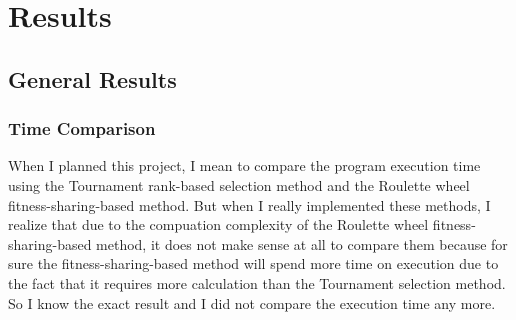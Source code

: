 \documentclass[10pt,b5paper]{article}
\begin{document}
\section{Results}
\label{sec-3}
\subsection{General Results}
\label{sec-3-1}
\subsubsection{Time Comparison}
\label{sec-3-1-1}
When I planned this project, I mean to compare the program execution time using the Tournament rank-based selection method and the Roulette wheel fitness-sharing-based method. But when I really implemented these methods, I realize that due to the compuation complexity of the Roulette wheel fitness-sharing-based method, it does not make sense at all to compare them because for sure the fitness-sharing-based method will spend more time on execution due to the fact that it requires more calculation than the Tournament selection method. So I know the exact result and I did not compare the execution time any more. 
\end{document}
